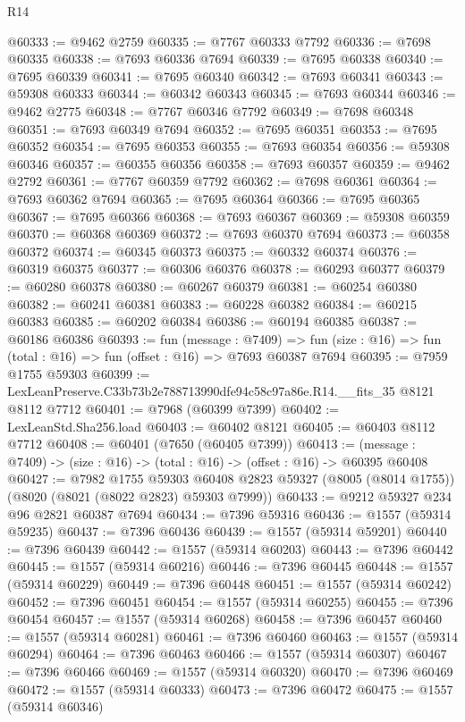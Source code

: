 \begin{lexlean}{R14}
\begin{coremodule}
@60333 := @9462 @2759
@60335 := @7767 @60333 @7792
@60336 := @7698 @60335
@60338 := @7693 @60336 @7694
@60339 := @7695 @60338
@60340 := @7695 @60339
@60341 := @7695 @60340
@60342 := @7693 @60341
@60343 := @59308 @60333
@60344 := @60342 @60343
@60345 := @7693 @60344
@60346 := @9462 @2775
@60348 := @7767 @60346 @7792
@60349 := @7698 @60348
@60351 := @7693 @60349 @7694
@60352 := @7695 @60351
@60353 := @7695 @60352
@60354 := @7695 @60353
@60355 := @7693 @60354
@60356 := @59308 @60346
@60357 := @60355 @60356
@60358 := @7693 @60357
@60359 := @9462 @2792
@60361 := @7767 @60359 @7792
@60362 := @7698 @60361
@60364 := @7693 @60362 @7694
@60365 := @7695 @60364
@60366 := @7695 @60365
@60367 := @7695 @60366
@60368 := @7693 @60367
@60369 := @59308 @60359
@60370 := @60368 @60369
@60372 := @7693 @60370 @7694
@60373 := @60358 @60372
@60374 := @60345 @60373
@60375 := @60332 @60374
@60376 := @60319 @60375
@60377 := @60306 @60376
@60378 := @60293 @60377
@60379 := @60280 @60378
@60380 := @60267 @60379
@60381 := @60254 @60380
@60382 := @60241 @60381
@60383 := @60228 @60382
@60384 := @60215 @60383
@60385 := @60202 @60384
@60386 := @60194 @60385
@60387 := @60186 @60386
@60393 := fun (message : @7409) =>
  fun (size : @16) => fun (total : @16) => fun (offset : @16) => @7693 @60387 @7694
@60395 := @7959 @1755 @59303
@60399 := LexLeanPreserve.C33b73b2e788713990dfe94c58c97a86e.R14.__fits_35 @8121 @8112 @7712
@60401 := @7968 (@60399 @7399)
@60402 := LexLeanStd.Sha256.load
@60403 := @60402 @8121
@60405 := @60403 @8112 @7712
@60408 := @60401 (@7650 (@60405 @7399))
@60413 := (message : @7409) -> (size : @16) -> (total : @16) -> (offset : @16) -> @60395 @60408
@60427 := @7982
    @1755
    @59303
    @60408
    @2823
    @59327
    (@8005 (@8014 @1755))
    (@8020 (@8021 (@8022 @2823) @59303 @7999))
@60433 := @9212 @59327 @234 @96 @2821 @60387 @7694
@60434 := @7396 @59316
@60436 := @1557 (@59314 @59235)
@60437 := @7396 @60436
@60439 := @1557 (@59314 @59201)
@60440 := @7396 @60439
@60442 := @1557 (@59314 @60203)
@60443 := @7396 @60442
@60445 := @1557 (@59314 @60216)
@60446 := @7396 @60445
@60448 := @1557 (@59314 @60229)
@60449 := @7396 @60448
@60451 := @1557 (@59314 @60242)
@60452 := @7396 @60451
@60454 := @1557 (@59314 @60255)
@60455 := @7396 @60454
@60457 := @1557 (@59314 @60268)
@60458 := @7396 @60457
@60460 := @1557 (@59314 @60281)
@60461 := @7396 @60460
@60463 := @1557 (@59314 @60294)
@60464 := @7396 @60463
@60466 := @1557 (@59314 @60307)
@60467 := @7396 @60466
@60469 := @1557 (@59314 @60320)
@60470 := @7396 @60469
@60472 := @1557 (@59314 @60333)
@60473 := @7396 @60472
@60475 := @1557 (@59314 @60346)

\end{coremodule}
\end{lexlean}
